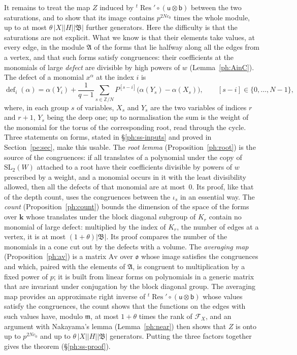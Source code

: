 \documentclass[10pt]{amsart}
\theoremstyle{definition}
\theoremstyle{remark}
\newcommand{\Z}{\mathbb Z}
\providecommand{\pam}{\mathfrak m}
\providecommand{\pao}{\mathfrak o}
\providecommand{\phA}{\mathfrak A}
\providecommand{\phB}{\mathfrak B}
\providecommand{\phdef}{\operatorname{def}}
\providecommand{\phk}{\boldsymbol k}
\begin{document}
It remains to treat the map $Z$ induced by ${}^t\operatorname{Res}'\circ(\mathsf u\otimes
\mathsf b)$ between the two saturations, and to show that its image contains $p^{2Nc_0}$ times
the whole module, up to at most $\theta\,|X||H||\phB|$ further generators. Here the difficulty is that the saturations are not explicit. What we
know is that their elements take values, at every edge, in the module $\phA$ of the forms that
lie halfway along all the edges from a vertex, and that such forms satisfy congruences: their
coefficients at the monomials of large \emph{defect} are divisible by high powers of $w$
(Lemma~\ref{ph:AinC}). The defect of a monomial $x^\alpha$ at the index $i$ is
\[
\phdef_i(\alpha)=\alpha(Y_i)+\frac1{q-1}\sum_{s\in\Z/N}P^{[s-i]}\bigl(\alpha(Y_s)-\alpha(X_s)
\bigr),\qquad[s-i]\in\{0,\dots,N-1\},
\]
where, in each group $s$ of variables, $X_s$ and $Y_s$ are the two variables of indices $r$ and
$r+1$, $Y_s$ being the deep one; up to normalisation the sum is the weight of the monomial for the
torus of the corresponding root, read through the cycle. Three statements on forms, stated in
\S\ref{ph:ss-inputs} and proved in Section~\ref{pe:sec}, make this usable. The \emph{root lemma}
(Proposition~\ref{ph:root}) is the source of the congruences: if all translates of a polynomial
under the copy of $\mathrm{SL}_2(W)$ attached to a root have their coefficients divisible by
powers of $w$ prescribed by a weight, and a monomial occurs in it with the least divisibility
allowed, then all the defects of that monomial are at most~$0$. Its proof, like that of the depth count,
uses the congruences between the $\iota_s$ in an essential way. The \emph{count} (Proposition~\ref{ph:count}) bounds the dimension
of the space of the forms over $\phk$ whose translates under the block diagonal subgroup of $K_r$
contain no monomial of large defect: multiplied by the index of $K_r$, the number of edges at a
vertex, it is at most $(1+\theta)|\phB|$. Its proof compares the number of the monomials in a
cone cut out by the defects with a volume. The \emph{averaging map}
(Proposition~\ref{ph:av}) is a matrix $\mathrm{Av}$ over $\pao$ whose image satisfies the
congruences and which, paired with the elements of $\phA$, is congruent to multiplication by a
fixed power of $p$; it is built from linear forms on polynomials in a generic matrix that are
invariant under conjugation by the block diagonal group. The averaging map provides an
approximate right inverse of ${}^t\operatorname{Res}'\circ(\mathsf u\otimes\mathsf b)$ whose
values satisfy the congruences, the count shows that the functions on the edges with such values
have, modulo $\pam$, at most $1+\theta$ times the rank of $\mathcal F_X$, and an argument with
Nakayama's lemma (Lemma~\ref{ph:near}) then shows that $Z$ is onto up to $p^{2Nc_0}$ and up to
$\theta\,|X||H||\phB|$ generators. Putting the three factors together gives the theorem
(\S\ref{ph:ss-proof}).
\end{document}
